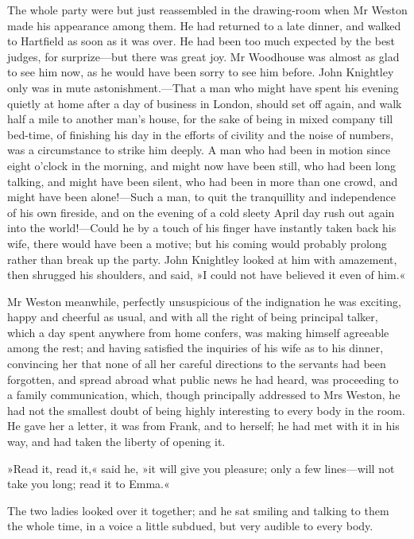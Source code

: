 The whole party were but just reassembled in the drawing-room when Mr Weston made his appearance among them. He had returned to a late dinner, and walked to Hartfield as soon as it was over. He had been too much expected by the best judges, for surprize—but there was great joy. Mr Woodhouse was almost as glad to see him now, as he would have been sorry to see him before. John Knightley only was in mute astonishment.—That a man who might have spent his evening quietly at home after a day of business in London, should set off again, and walk half a mile to another man's house, for the sake of being in mixed company till bed-time, of finishing his day in the efforts of civility and the noise of numbers, was a circumstance to strike him deeply. A man who had been in motion since eight o'clock in the morning, and might now have been still, who had been long talking, and might have been silent, who had been in more than one crowd, and might have been alone!—Such a man, to quit the tranquillity and independence of his own fireside, and on the evening of a cold sleety April day rush out again into the world!—Could he by a touch of his finger have instantly taken back his wife, there would have been a motive; but his coming would probably prolong rather than break up the party. John Knightley looked at him with amazement, then shrugged his shoulders, and said, »I could not have believed it even of him.«

Mr Weston meanwhile, perfectly unsuspicious of the indignation he was exciting, happy and cheerful as usual, and with all the right of being principal talker, which a day spent anywhere from home confers, was making himself agreeable among the rest; and having satisfied the inquiries of his wife as to his dinner, convincing her that none of all her careful directions to the servants had been forgotten, and spread abroad what public news he had heard, was proceeding to a family communication, which, though principally addressed to Mrs Weston, he had not the smallest doubt of being highly interesting to every body in the room. He gave her a letter, it was from Frank, and to herself; he had met with it in his way, and had taken the liberty of opening it.

»Read it, read it,« said he, »it will give you pleasure; only a few lines—will not take you long; read it to Emma.«

The two ladies looked over it together; and he sat smiling and talking to them the whole time, in a voice a little subdued, but very audible to every body.

